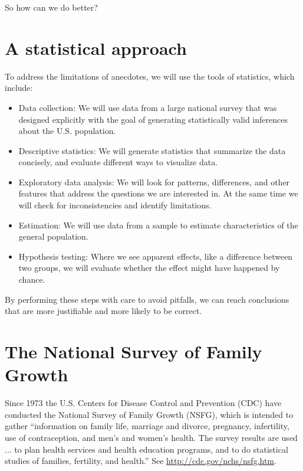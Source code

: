 \documentclass[12pt]{book}
\theoremstyle{exercise}
\begin{document}
So how can we do better?


\section{A statistical approach}

To address the limitations of anecdotes, we will use the tools
of statistics, which include:

\begin{itemize}

\item Data collection: We will use data from a large national survey
  that was designed explicitly with the goal of generating
  statistically valid inferences about the U.S. population.%

\item Descriptive statistics: We will generate statistics that
  summarize the data concisely, and evaluate different ways to
  visualize data.%

\item Exploratory data analysis: We will look for
  patterns, differences, and other features that address the questions
  we are interested in.  At the same time we will check for
  inconsistencies and identify limitations.%

\item Estimation: We will use data from a sample to estimate
  characteristics of the general population.%

\item Hypothesis testing: Where we see apparent effects, like a
  difference between two groups, we will evaluate whether the effect
  might have happened by chance.%

\end{itemize}

By performing these steps with care to avoid pitfalls, we can
reach conclusions that are more justifiable and more likely to be
correct.


\section{The National Survey of Family Growth}%
\label{nsfg}

Since 1973 the U.S. Centers for Disease Control and Prevention (CDC)
have conducted the National Survey of Family Growth (NSFG),
which is intended to gather ``information on family life, marriage and
divorce, pregnancy, infertility, use of contraception, and men's and
women's health. The survey results are used ... to plan health services and
health education programs, and to do statistical studies of families,
fertility, and health.''  See
  \url{http://cdc.gov/nchs/nsfg.htm}.%
%
\end{document}
